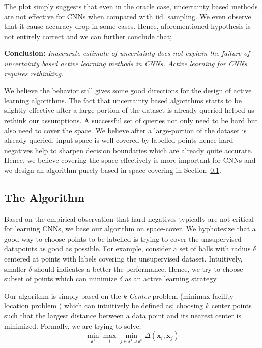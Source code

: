 \documentclass{article}
\begin{document}
The plot simply suggests that even in the oracle case, uncertainty based methods are not effective for CNNs when compared with iid. sampling. We even observe that it cause accuracy drop in some cases. Hence, aforementioned hypothesis is not entirely correct and we can further conclude that;

\noindent\textbf{Conclusion:} \emph{Inaccurate estimate of uncertainty does not explain the failure of uncertainty based active learning methods in CNNs. Active learning for CNNs requires rethinking.}

We believe the behavior still gives some good directions for the design of active learning algorithms.  The fact that uncertainty based algorithms starts to be slightly effective after a large-portion of the dataset is already queried helped us rethink our assumptions. A successful set of queries not only need to be hard but also need to cover the space. We believe after a large-portion of the dataset is already queried, input space is well covered by labelled points hence hard-negatives help to sharpen decision boundaries which are already quite accurate. Hence, we believe covering the space effectively is more important for CNNs and we design an algorithm purely based in space covering in Section~\ref{sec:alg}.

\subsection{The Algorithm}
\label{sec:alg}
Based on the empirical observation that hard-negatives typically are not critical for learning CNNs, we base our algorithm on space-cover. We hyphotesize that a good way to choose points to be labelled is trying to cover the unsupervised datapoints as good as possible. For example, consider a set of balls with radius $\delta$ centered at points with labels covering the unsupervised dataset. Intuitively, smaller $\delta$ should indicates a better the performance. Hence, we try to choose subset of points which can minimize $\delta$ as an active learning strategy. 

Our algorithm is simply based on the \emph{k-Center} problem (minimax facility location problem \cite{facility}) which can intuitively be defined as; choosing $k$ center points such that the largest distance between a data point and its nearest center is minimized. Formally, we are trying to solve;
\begin{equation}
\min_{\mathbf{s}^1} \max_i \min_{j \in \mathbf{s}^1 \cup \mathbf{s}^0} \Delta(\mathbf{x}_i,\mathbf{x}_j)
\end{equation}
\end{document}
